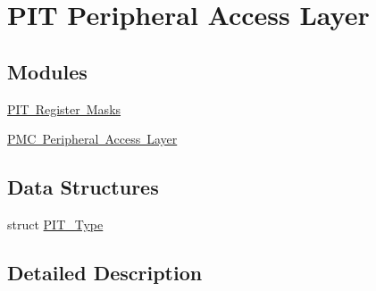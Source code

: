 \hypertarget{group___p_i_t___peripheral___access___layer}{}\section{P\+IT Peripheral Access Layer}
\label{group___p_i_t___peripheral___access___layer}
\subsection*{Modules}
\begin{DoxyCompactItemize}
\item 
\mbox{\hyperlink{group___p_i_t___register___masks}{P\+I\+T Register Masks}}
\item 
\mbox{\hyperlink{group___p_m_c___peripheral___access___layer}{P\+M\+C Peripheral Access Layer}}
\end{DoxyCompactItemize}
\subsection*{Data Structures}
\begin{DoxyCompactItemize}
\item 
struct \mbox{\hyperlink{struct_p_i_t___type}{P\+I\+T\+\_\+\+Type}}
\end{DoxyCompactItemize}


\subsection{Detailed Description}
